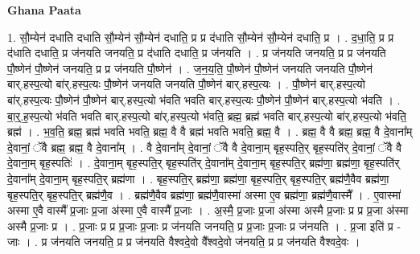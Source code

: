 \documentclass[17pt]{extarticle}
\begin{document}
\textbf{Ghana Paata } \newline

1. सौ॒म्येन॑ दधाति दधाति सौ॒म्येन॑ सौ॒म्येन॑ दधाति॒ प्र प्र द॑धाति सौ॒म्येन॑ सौ॒म्येन॑ दधाति॒ प्र । . द॒धा॒ति॒ प्र प्र द॑धाति दधाति॒ प्र ज॑नयति जनयति॒ प्र द॑धाति दधाति॒ प्र ज॑नयति । . प्र ज॑नयति जनयति॒ प्र प्र ज॑नयति पौ॒ष्णेन॑ पौ॒ष्णेन॑ जनयति॒ प्र प्र ज॑नयति पौ॒ष्णेन॑ । . ज॒न॒य॒ति॒ पौ॒ष्णेन॑ पौ॒ष्णेन॑ जनयति जनयति पौ॒ष्णेन॑ बार्.हस्प॒त्यो बा॑र्.हस्प॒त्यः पौ॒ष्णेन॑ जनयति जनयति पौ॒ष्णेन॑ बार्.हस्प॒त्यः । . पौ॒ष्णेन॑ बार्.हस्प॒त्यो बा॑र्.हस्प॒त्यः पौ॒ष्णेन॑ पौ॒ष्णेन॑ बार्.हस्प॒त्यो भ॑वति भवति बार्.हस्प॒त्यः पौ॒ष्णेन॑ पौ॒ष्णेन॑ बार्.हस्प॒त्यो भ॑वति । . बा॒र्॒.ह॒स्प॒त्यो भ॑वति भवति बार्.हस्प॒त्यो बा॑र्.हस्प॒त्यो भ॑वति॒ ब्रह्म॒ ब्रह्म॑ भवति बार्.हस्प॒त्यो बा॑र्.हस्प॒त्यो भ॑वति॒ ब्रह्म॑ । . भ॒व॒ति॒ ब्रह्म॒ ब्रह्म॑ भवति भवति॒ ब्रह्म॒ वै वै ब्रह्म॑ भवति भवति॒ ब्रह्म॒ वै । . ब्रह्म॒ वै वै ब्रह्म॒ ब्रह्म॒ वै दे॒वाना᳚म् दे॒वानां॒ ॅवै ब्रह्म॒ ब्रह्म॒ वै दे॒वाना᳚म् । . वै दे॒वाना᳚म् दे॒वानां॒ ॅवै वै दे॒वाना॒म् बृह॒स्पति॒र् बृह॒स्पति॑र् दे॒वानां॒ ॅवै वै दे॒वाना॒म् बृह॒स्पतिः॑ । . दे॒वाना॒म् बृह॒स्पति॒र् बृह॒स्पति॑र् दे॒वाना᳚म् दे॒वाना॒म् बृह॒स्पति॒र् ब्रह्म॑णा॒ ब्रह्म॑णा॒ बृह॒स्पति॑र् दे॒वाना᳚म् दे॒वाना॒म् बृह॒स्पति॒र् ब्रह्म॑णा । . बृह॒स्पति॒र् ब्रह्म॑णा॒ ब्रह्म॑णा॒ बृह॒स्पति॒र् बृह॒स्पति॒र् ब्रह्म॑णै॒वैव ब्रह्म॑णा॒ बृह॒स्पति॒र् बृह॒स्पति॒र् ब्रह्म॑णै॒व । . ब्रह्म॑णै॒वैव ब्रह्म॑णा॒ ब्रह्म॑णै॒वास्मा॑ अस्मा ए॒व ब्रह्म॑णा॒ ब्रह्म॑णै॒वास्मै᳚ । . ए॒वास्मा॑ अस्मा ए॒वै वास्मै᳚ प्र॒जाः प्र॒जा अ॑स्मा ए॒वै वास्मै᳚ प्र॒जाः । . अ॒स्मै॒ प्र॒जाः प्र॒जा अ॑स्मा अस्मै प्र॒जाः प्र प्र प्र॒जा अ॑स्मा अस्मै प्र॒जाः प्र । . प्र॒जाः प्र प्र प्र॒जाः प्र॒जाः प्र ज॑नयति जनयति॒ प्र प्र॒जाः प्र॒जाः प्र ज॑नयति । . प्र॒जा इति॑ प्र - जाः । . प्र ज॑नयति जनयति॒ प्र प्र ज॑नयति वैश्वदे॒वो वै᳚श्वदे॒वो ज॑नयति॒ प्र प्र ज॑नयति वैश्वदे॒वः । \newline
\end{document}
